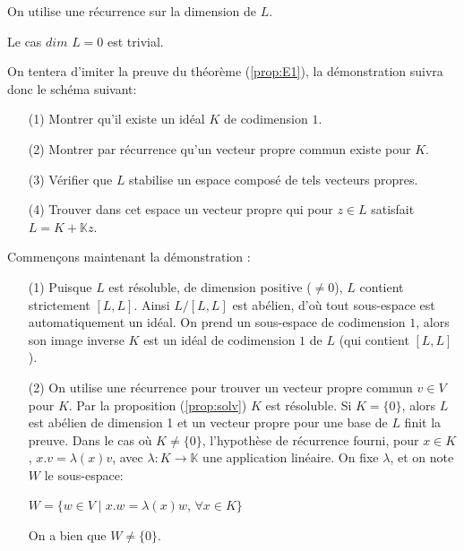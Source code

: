 \documentclass[a4paper,openany,12pt]{report}
\newcommand{\KK}{\mathbb{K}}
\theoremstyle{break}
{\theorembodyfont{\upshape}
\newtheorem*{rmq}{Remarque :}
\newtheorem*{prv}{Preuve :}
\newtheorem*{ex}{Exemples :}
\newtheorem*{exe}{Exemple : }
\newtheorem*{nota}{Notation :}
\newtheorem*{dem}{D\'emonstration :}}
\begin{document}
\begin{dem}
\quad On utilise une récurrence sur la dimension de $L$.

Le cas $dim$ $L=0$ est trivial.

On tentera d'imiter la preuve du théorème (\ref{prop:E1}), la démonstration suivra donc le schéma suivant:
\begin{itemize}
\item[(1)] Montrer qu'il existe un idéal $K$ de codimension $1$.
\item[(2)] Montrer par récurrence qu'un vecteur propre commun existe pour $K$.
\item[(3)] Vérifier que $L$ stabilise un espace composé de tels vecteurs propres.
\item[(4)] Trouver dans cet espace un vecteur propre qui pour $z \in L$ satisfait $L=K+\KK z$.
\end{itemize}
Commençons maintenant la démonstration :
\begin{itemize}
\item[(1)] Puisque $L$ est résoluble, de dimension positive ($\neq  0$), $L$ contient strictement $[L,L]$. Ainsi $L/[L,L]$ est abélien, d'où tout sous-espace est automatiquement un idéal. On prend un sous-espace de codimension $1$, alors son image inverse $K$ est un idéal de codimension $1$ de $L$ (qui contient $[L,L]$).

\item[(2)] On utilise une récurrence pour trouver un vecteur propre commun $v \in V$ pour $K$. Par la proposition (\ref{prop:solv}) $K$ est résoluble. Si $K = \{ 0 \}$, alors $L$ est abélien de dimension 1 et un vecteur propre pour une base de $L$ finit la preuve. Dans le cas où $K \neq \{ 0 \}$, l'hypothèse de récurrence fourni, pour $x \in K$, $x.v= \lambda(x)v$, avec $\lambda : K \to \KK$ une application linéaire. On fixe $\lambda$, et on note $W$ le sous-espace:
\begin{center}
$W=\{ w \in V \mid x.w= \lambda(x)w$, $\forall x \in K \} $
\end{center}
On a bien que $W \neq \{0\}$.


\end{itemize}
\end{dem}
\end{document}
